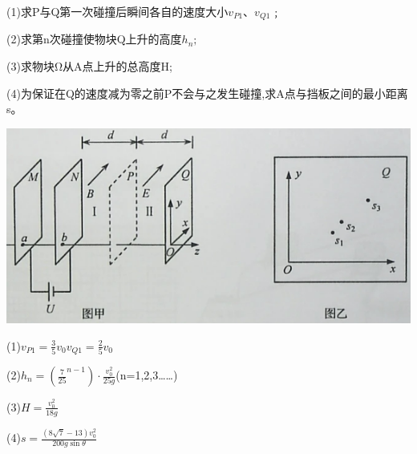 (1)求P与Q第一次碰撞后瞬间各自的速度大小$v_{P1}$、$v_{Q1}﹔$

(2)求第n次碰撞使物块Q上升的高度$h_n;$

(3)求物块Ω从A点上升的总高度H;

(4)为保证在Q的速度减为零之前P不会与之发生碰撞,求A点与挡板之间的最小距离s。\begin{center}\includegraphics[]{img/image15.png}\end{center}
\begin{solution}{4cm}
    (1)$v_{P1}=\frac{3}{5}v_0$$v_{Q1}=\frac{2}{5}v_0$

    (2)$h_n=(\frac{7}{25}^{n-1})\cdot \frac{v_0^2}{25g}$(n=1,2,3……)

    (3)$H=\frac{v_0^2}{18g}$

    (4)$s=\frac{(8\sqrt{7}-13)v_0^2}{200g\sin\theta}$
\end{solution}